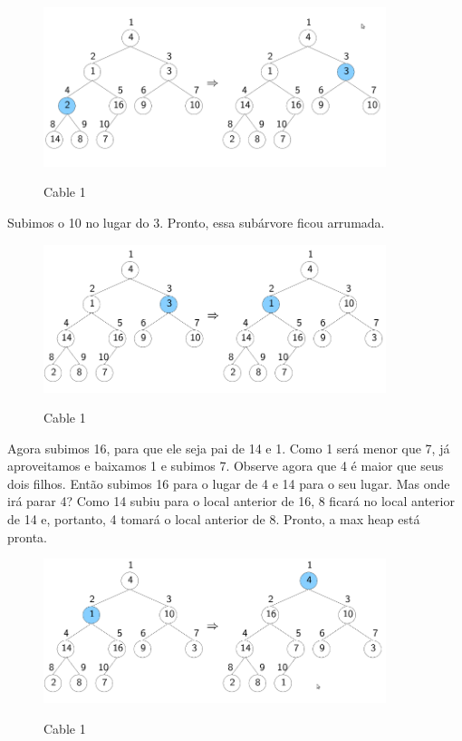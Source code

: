 \documentclass{article}
\begin{document}
\begin{figure}[h]
    \center
    \includegraphics[width=10cm]{imagens/heap2.png}
    \label{cable}
    \caption{Cable 1}
\end{figure}

Subimos o 10 no lugar do 3. Pronto, essa subárvore ficou arrumada.

\begin{figure}[h]
    \center
    \includegraphics[width=10cm]{imagens/heap3.png}
    \label{cable}
    \caption{Cable 1}
\end{figure}

\newpage

Agora subimos 16, para que ele seja pai de 14 e 1. Como 1 será menor que 7, já aproveitamos e
baixamos 1 e subimos 7. Observe agora que 4 é maior que seus dois filhos. Então subimos 16 para o
lugar de 4 e 14 para o seu lugar. Mas onde irá parar 4? Como 14 subiu para o local anterior de 16, 8
ficará no local anterior de 14 e, portanto, 4 tomará o local anterior de 8. Pronto, a max heap está
pronta.

\begin{figure}[h]
    \center
    \includegraphics[width=10cm]{imagens/heap4.png}
    \label{cable}
    \caption{Cable 1}
\end{figure}
\end{document}
